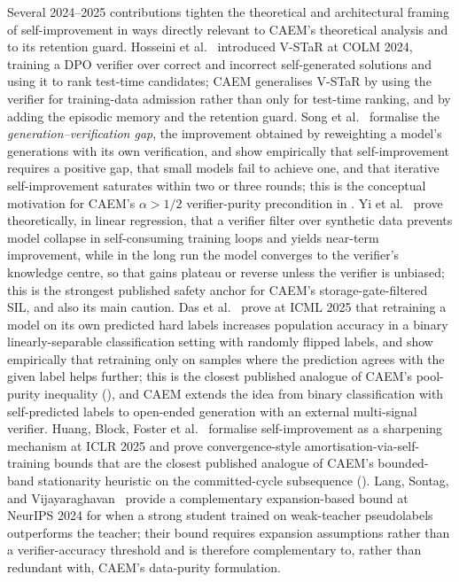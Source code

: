 Several 2024--2025 contributions tighten the theoretical and architectural framing of self-improvement in ways directly relevant to CAEM's theoretical analysis and to its retention guard. Hosseini et al.~\cite{hosseini2024vstar} introduced V-STaR at COLM 2024, training a DPO verifier over correct and incorrect self-generated solutions and using it to rank test-time candidates; CAEM generalises V-STaR by using the verifier for training-data admission rather than only for test-time ranking, and by adding the episodic memory and the retention guard. Song et al.~\cite{song2024gap} formalise the \emph{generation--verification gap}, the improvement obtained by reweighting a model's generations with its own verification, and show empirically that self-improvement requires a positive gap, that small models fail to achieve one, and that iterative self-improvement saturates within two or three rounds; this is the conceptual motivation for CAEM's $\alpha > 1/2$ verifier-purity precondition in . Yi et al.~\cite{fu2025collapse} prove theoretically, in linear regression, that a verifier filter over synthetic data prevents model collapse in self-consuming training loops and yields near-term improvement, while in the long run the model converges to the verifier's knowledge centre, so that gains plateau or reverse unless the verifier is unbiased; this is the strongest published safety anchor for CAEM's storage-gate-filtered SIL, and also its main caution. Das et al.~\cite{das2025retraining} prove at ICML 2025 that retraining a model on its own predicted hard labels increases population accuracy in a binary linearly-separable classification setting with randomly flipped labels, and show empirically that retraining only on samples where the prediction agrees with the given label helps further; this is the closest published analogue of CAEM's pool-purity inequality (), and CAEM extends the idea from binary classification with self-predicted labels to open-ended generation with an external multi-signal verifier. Huang, Block, Foster et al.~\cite{huang2025sharpening} formalise self-improvement as a sharpening mechanism at ICLR 2025 and prove convergence-style amortisation-via-self-training bounds that are the closest published analogue of CAEM's bounded-band stationarity heuristic on the committed-cycle subsequence (). Lang, Sontag, and Vijayaraghavan~\cite{lang2024w2s} provide a complementary expansion-based bound at NeurIPS 2024 for when a strong student trained on weak-teacher pseudolabels outperforms the teacher; their bound requires expansion assumptions rather than a verifier-accuracy threshold and is therefore complementary to, rather than redundant with, CAEM's data-purity formulation.

